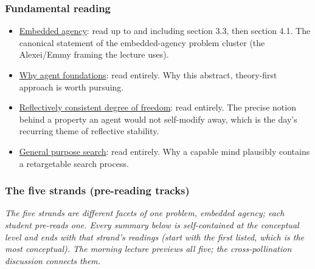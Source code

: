\documentclass[11pt]{article}
\begin{document}
\subsubsection{Fundamental reading}
\begin{itemize}
\item
  \href{https://www.lesswrong.com/posts/i3BTagvt3HbPMx6PN/embedded-agency-full-text-version}{Embedded agency}: read up to and including section 3.3, then section 4.1. The canonical statement of the embedded-agency problem cluster (the Alexei/Emmy framing the lecture uses).
\item
  \href{https://www.lesswrong.com/posts/FWvzwCDRgcjb9sigb/why-agent-foundations-an-overly-abstract-explanation}{Why agent foundations}: read entirely. Why this abstract, theory-first approach is worth pursuing.
\item
  \href{https://www.lesswrong.com/w/reflectively-consistent-degree-of-freedom}{Reflectively consistent degree of freedom}: read entirely. The precise notion behind a property an agent would not self-modify away, which is the day's recurring theme of reflective stability.
\item
  \href{https://www.lesswrong.com/posts/6mysMAqvo9giHC4iX/what-s-general-purpose-search-and-why-might-we-expect-to-see}{General purpose search}: read entirely. Why a capable mind plausibly contains a retargetable search process.
\end{itemize}

\subsubsection{The five strands (pre-reading tracks)}
\emph{The five strands are different facets of one problem, embedded agency; each student pre-reads one. Every summary below is self-contained at the conceptual level and ends with that strand's readings (start with the first listed, which is the most conceptual). The morning lecture previews all five; the cross-pollination discussion connects them.}
\end{document}

